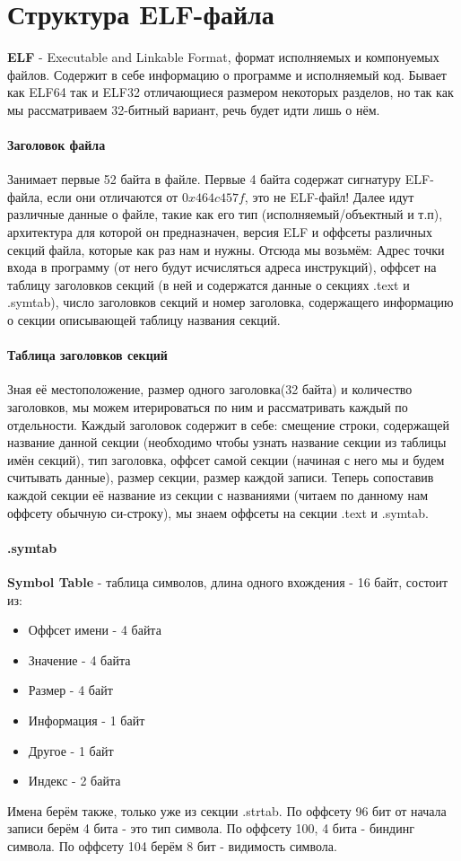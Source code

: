 \documentclass{article}
\begin{document}
\section*{Структура ELF-файла}
\textbf{ELF} - Executable and Linkable Format, формат исполняемых и компонуемых файлов. Содержит в себе информацию о программе и исполняемый код. Бывает как ELF64 так и ELF32 отличающиеся размером некоторых разделов, но так как мы рассматриваем 32-битный вариант, речь будет идти лишь о нём.
\paragraph{Заголовок файла}
Занимает первые 52 байта в файле. Первые 4 байта содержат сигнатуру ELF-файла, если они отличаются от $0x464c457f$, это не ELF-файл! Далее идут различные данные о файле, такие как его тип (исполняемый/объектный и т.п), архитектура для которой он предназначен, версия ELF и оффсеты различных секций файла, которые как раз нам и нужны. Отсюда мы возьмём: Адрес точки входа в программу (от него будут исчисляться адреса инструкций), оффсет на таблицу заголовков секций (в ней и содержатся данные о секциях .text и .symtab), число заголовков секций и номер заголовка, содержащего информацию о секции описывающей таблицу названия секций.
\paragraph{Таблица заголовков секций}
Зная её местоположение, размер одного заголовка(32 байта) и количество заголовков, мы можем итерироваться по ним и рассматривать каждый по отдельности. Каждый заголовок содержит в себе: смещение строки, содержащей название данной секции (необходимо чтобы узнать название секции из таблицы имён секций), тип заголовка, оффсет самой секции (начиная с него мы и будем считывать данные), размер секции, размер каждой записи. Теперь сопоставив каждой секции её название из секции с названиями (читаем по данному нам оффсету обычную си-строку), мы знаем оффсеты на секции .text и .symtab.
\paragraph{.symtab}
\textbf{Symbol Table} - таблица символов, длина одного вхождения - 16 байт, состоит из:
\begin{itemize}
	\item{Оффсет имени - 4 байта}
	\item{Значение - 4 байта}
	\item{Размер - 4 байт}
	\item{Информация - 1 байт}
	\item{Другое - 1 байт}
	\item{Индекс - 2 байта}
\end{itemize}
Имена берём также, только уже из секции .strtab. По оффсету 96 бит от начала записи берём 4 бита - это тип символа. По оффсету 100, 4 бита - биндинг символа. По оффсету 104 берём 8 бит - видимость символа. 
\end{document}
